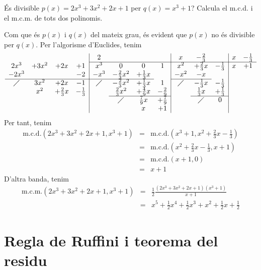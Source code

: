 \begin{exercici}
 És divisible $p(x)=2x^{3}+3x^{2}+2x+1$ per $q(x)=x^{3}+1$?
Calcula el m.c.d. i el m.c.m. de tots dos polinomis.
\end{exercici}

\begin{solucio}
Com que és $p(x)$ i $q(x)$ del mateix grau, és evident que $p(x)$ no és
divisible per $q(x)$. Per l'algorisme d'Euclides, tenim\[
\begin{array}{cccc|cccc|ccc|cc}
& & & & 2 & & & & x & -\frac{2}{3} & & x & -\frac{1}{3} \\
\cline{5-13}
2x^{3} & +3x^{2} & +2x & +1 & x^{3} & 0 & 0 & 1 & x^{2} & +\frac{2}{3}x & -\frac{1}{3} & x & +1 \\
-2x^{3} & & & -2 & -x^{3} & -\frac{2}{3}x^{2} & +\frac{1}{3}x & & -x^{2}
& -x & & & \\ \cline{1-4}\cline{5-7}\cline{9-10}
\diagup & 3x^{2} & +2x & -1 & \diagup & -\frac{2}{3}x^{2} & +\frac{1}{3}x & 1
& \diagup & -\frac{1}{3}x & -\frac{1}{3} & & \\
& x^{2} & +\frac{2}{3}x & -\frac{1}{3} & & \frac{2}{3}x^{2} & +\frac{4}{9}x
& -\frac{2}{9} & & \frac{1}{3}x & +\frac{1}{3} & & \\
\cline{6-8}\cline{10-11}
& & & & & \diagup & \frac{7}{9}x & +\frac{7}{9} & & \diagup & 0 & &
\\
& & & & & & x & +1 & & & & &
\end{array}\]Per tant, tenim\begin{eqnarray*}
\text{m.c.d.}\left( 2x^{3}+3x^{2}+2x+1,x^{3}+1\right) &=&\text{m.c.d.}\left(
x^{3}+1,x^{2}+\frac{2}{3}x-\frac{1}{3}\right) \\
&=&\text{m.c.d.}\left( x^{2}+\frac{2}{3}x-\frac{1}{3},x+1\right) \\
&=&\text{m.c.d.}\left( x+1,0\right) \\
&=&x+1
\end{eqnarray*}D'altra banda, tenim\begin{eqnarray*}
\text{m.c.m.}\left( 2x^{3}+3x^{2}+2x+1,x^{3}+1\right) &=&\frac{1}{2}\frac{\left( 2x^{3}+3x^{2}+2x+1\right) \left( x^{3}+1\right) }{x+1} \\
&=&x^{5}+\frac{1}{2}x^{4}+\frac{1}{2}x^{3}+x^{2}+\frac{1}{2}x+\frac{1}{2}
\end{eqnarray*}
\end{solucio}

\section{Regla de Ruffini i teorema del residu}


